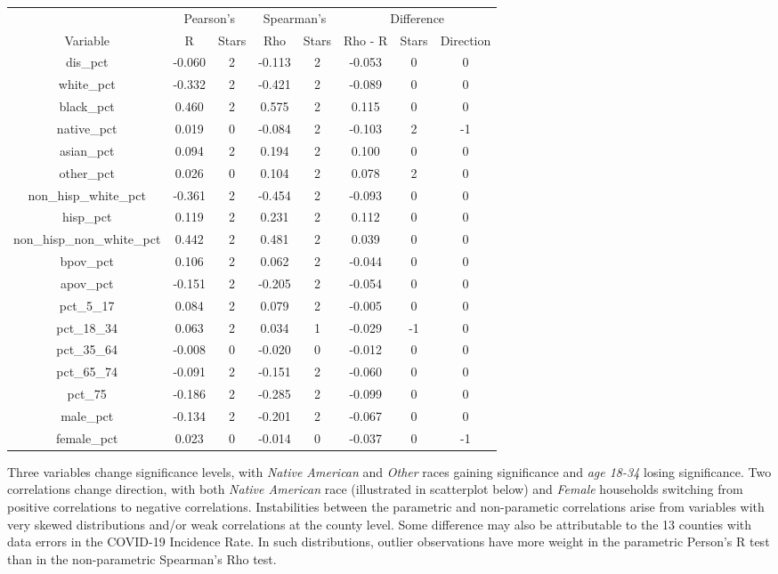 \documentclass[
]{article}
\begin{document}
\begin{table}
\centering
\begin{tabular}{c|c|c|c|c|c|c|c}
\hline
\multicolumn{1}{c|}{ } & \multicolumn{2}{c|}{Pearson's} & \multicolumn{2}{c|}{Spearman's} & \multicolumn{3}{c}{Difference} \\
\cline{2-3} \cline{4-5} \cline{6-8}
Variable & R & Stars & Rho & Stars & Rho - R & Stars & Direction\\
\hline
dis\_pct & -0.060 & 2 & -0.113 & 2 & -0.053 & 0 & 0\\
\hline
white\_pct & -0.332 & 2 & -0.421 & 2 & -0.089 & 0 & 0\\
\hline
black\_pct & 0.460 & 2 & 0.575 & 2 & 0.115 & 0 & 0\\
\hline
native\_pct & 0.019 & 0 & -0.084 & 2 & -0.103 & 2 & -1\\
\hline
asian\_pct & 0.094 & 2 & 0.194 & 2 & 0.100 & 0 & 0\\
\hline
other\_pct & 0.026 & 0 & 0.104 & 2 & 0.078 & 2 & 0\\
\hline
non\_hisp\_white\_pct & -0.361 & 2 & -0.454 & 2 & -0.093 & 0 & 0\\
\hline
hisp\_pct & 0.119 & 2 & 0.231 & 2 & 0.112 & 0 & 0\\
\hline
non\_hisp\_non\_white\_pct & 0.442 & 2 & 0.481 & 2 & 0.039 & 0 & 0\\
\hline
bpov\_pct & 0.106 & 2 & 0.062 & 2 & -0.044 & 0 & 0\\
\hline
apov\_pct & -0.151 & 2 & -0.205 & 2 & -0.054 & 0 & 0\\
\hline
pct\_5\_17 & 0.084 & 2 & 0.079 & 2 & -0.005 & 0 & 0\\
\hline
pct\_18\_34 & 0.063 & 2 & 0.034 & 1 & -0.029 & -1 & 0\\
\hline
pct\_35\_64 & -0.008 & 0 & -0.020 & 0 & -0.012 & 0 & 0\\
\hline
pct\_65\_74 & -0.091 & 2 & -0.151 & 2 & -0.060 & 0 & 0\\
\hline
pct\_75 & -0.186 & 2 & -0.285 & 2 & -0.099 & 0 & 0\\
\hline
male\_pct & -0.134 & 2 & -0.201 & 2 & -0.067 & 0 & 0\\
\hline
female\_pct & 0.023 & 0 & -0.014 & 0 & -0.037 & 0 & -1\\
\hline
\end{tabular}
\end{table}

Three variables change significance levels, with \emph{Native American}
and \emph{Other} races gaining significance and \emph{age 18-34} losing
significance. Two correlations change direction, with both \emph{Native
American} race (illustrated in scatterplot below) and \emph{Female}
households switching from positive correlations to negative
correlations. Instabilities between the parametric and non-parametic
correlations arise from variables with very skewed distributions and/or
weak correlations at the county level. Some difference may also be
attributable to the 13 counties with data errors in the COVID-19
Incidence Rate. In such distributions, outlier observations have more
weight in the parametric Person's R test than in the non-parametric
Spearman's Rho test.
\end{document}
